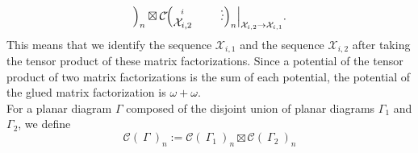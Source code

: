 \documentclass[10pt]{amsart}
\theoremstyle{break}
\begin{document}
$$\Big)_{n} \boxtimes {{\mathcal{C}}}\acute{}\Big(
\unitlength 0.1in
\begin{picture}(6.25,1.7500)(2.0,-4.500)
\special{pn 8}\special{ar 635 400 100 100  0.0000000 0.1200000}\special{ar 635 400 100 100  0.4800000 0.6000000}\special{ar 635 400 100 100  0.9600000 1.0800000}\special{ar 635 400 100 100  1.4400000 1.5600000}\special{ar 635 400 100 100  1.9200000 2.0400000}\special{ar 635 400 100 100  2.4000000 2.5200000}\special{ar 635 400 100 100  2.8800000 3.0000000}\special{ar 635 400 100 100  3.3600000 3.4800000}\special{ar 635 400 100 100  3.8400000 3.9600000}\special{ar 635 400 100 100  4.3200000 4.4400000}\special{ar 635 400 100 100  4.8000000 4.9200000}\special{ar 635 400 100 100  5.2800000 5.4000000}\special{ar 635 400 100 100  5.7600000 5.8800000}\special{ar 635 400 100 100  6.2400000 6.2832853}\special{pn 8}\special{pa 535 400}\special{pa 503 441}\special{pa 475 476}\special{pa 452 499}\special{pa 438 504}\special{pa 435 487}\special{pa 439 452}\special{pa 439 415}\special{pa 427 392}\special{pa 400 386}\special{pa 363 393}\special{pa 335 400}\special{sp}\special{pn 8}\special{pa 335 400}\special{pa 335 400}\special{pa 335 400}\special{pa 335 400}\special{pa 335 400}\special{sp}\special{pn 8}\special{pa 635 500}\special{pa 675 550}\special{fp}\special{pa 735 450}\special{pa 805 520}\special{fp}\special{pa 725 350}\special{pa 805 310}\special{fp}\special{pa 635 300}\special{pa 665 250}\special{fp}\special{pn 8}\special{pa 525 410}\special{pa 535 400}\special{fp}\special{sh 1}\special{pa 535 400}\special{pa 474 433}\special{pa 497 438}\special{pa 502 461}\special{pa 535 400}\special{fp}\put(3.200,-5.0000){\makebox(0,0){$\mathcal{X}_{i,2}$}}\put(3.200,-3.50000){\makebox(0,0){${}_{i}$}}\put(8.000,-4.5000){\makebox(0,0){$\cdot$}}\put(8.1000,-4.000){\makebox(0,0){$\cdot$}}\put(8.000,-3.5000){\makebox(0,0){$\cdot$}}\end{picture}
\Big)_{n}\Big|_{\mathcal{X}_{i,2}\to\mathcal{X}_{i,1}}.
$$
This means that we identify the sequence $\mathcal{X}_{i,1}$ and the sequence $\mathcal{X}_{i,2}$ after taking the tensor product of these matrix factorizations. Since a potential of the tensor product of two matrix factorizations is the sum of each potential, the potential of the glued matrix factorization is $\omega+\omega\acute{}$.\\
\indent For a planar diagram $\Gamma$ composed of the disjoint union of planar diagrams $\Gamma_1$ and $\Gamma_2$, we define
$$
{{\mathcal{C}}}\acute{}(\ \Gamma\ )_{n} := {{\mathcal{C}}}\acute{}(\ \Gamma_1\ )_{n}\boxtimes {{\mathcal{C}}}\acute{}(\ \Gamma_2\ )_{n}
$$
\end{document}
